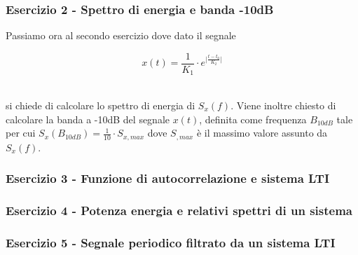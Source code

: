 \documentclass[../main.tex]{subfiles}
\begin{document}
\subsubsection{Esercizio 2 - Spettro di energia e banda -10dB}

Passiamo ora al secondo esercizio dove dato il segnale

\[x(t) = \frac{1}{K_1} \cdot e^{\big| \frac{t - t_0}{K_2} \big|} \]\

si chiede di calcolare lo spettro di energia di $S_x(f)$.
Viene inoltre chiesto di calcolare la banda a -10dB del segnale $x(t)$, definita come frequenza $B_{10\unit{dB}}$ tale per cui $S_x(B_{10\unit{dB}}) = \tfrac{1}{10} \cdot S_{x,\unit{max}}$ dove $S_{,\unit{max}}$ è il massimo valore assunto da $S_x(f)$.

\subsubsection{Esercizio 3 - Funzione di autocorrelazione e sistema LTI}





\subsubsection{Esercizio 4 - Potenza energia e relativi spettri di un sistema}

\subsubsection{Esercizio 5 - Segnale periodico filtrato da un sistema LTI}
\end{document}

